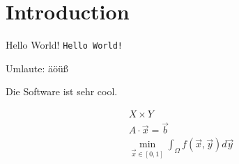 
\chapter{Introduction}

\cite{zenger91sparse}

Hello World! \texttt{Hello World!}

Umlaute: äöüß

Die Software \sgpp ist sehr cool.

\begin{gather}
  X \times Y\\
  A \cdot \vec{x} = \vec{b}\\
  \min_{\vec{x} \in [0, 1]} \int_\Omega f(\vec{x}, \vec{y}) d\vec{y}
\end{gather}

\blindmathpaper
